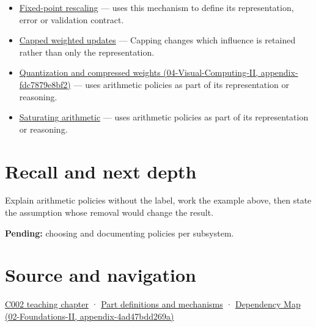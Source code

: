 \begin{itemize}
\item
  \hyperref[appendix-3333db47830f]{Fixed-point rescaling} --- uses this mechanism to define its representation, error or validation contract.
\item
  \hyperref[appendix-1e45d0613db3]{Capped weighted updates} --- Capping changes which influence is retained rather than only the representation.
\item
  \href{../04-Visual-Computing-II/main.pdf\#nameddest=appendix-fdc7879e8bf2}{Quantization and compressed weights (04-Visual-Computing-II, appendix-fdc7879e8bf2)} --- uses arithmetic policies as part of its representation or reasoning.
\item
  \hyperref[appendix-3999c6209649]{Saturating arithmetic} --- uses arithmetic policies as part of its representation or reasoning.
\end{itemize}

\section{Recall and next depth}\label{appendix-2ed044358b82-recall-and-next-depth}

Explain arithmetic policies without the label, work the example above, then state the assumption whose removal would change the result.

\textbf{Pending:} choosing and documenting policies per subsystem.

\section{Source and navigation}\label{appendix-2ed044358b82-source-and-navigation}

\href{Continuous\%20Notes/Computing\%20Foundations\%20-\%20From\%20Bits\%20to\%20C++\%20and\%20Systems\%20APIs\#Arithmetic\%20becomes\%20a\%20policy}{C002 teaching chapter} · \hyperref[appendix-fd090d982a15]{Part definitions and mechanisms} · \href{../02-Foundations-II/main.pdf\#nameddest=appendix-4ad47bdd269a}{Dependency Map (02-Foundations-II, appendix-4ad47bdd269a)}
